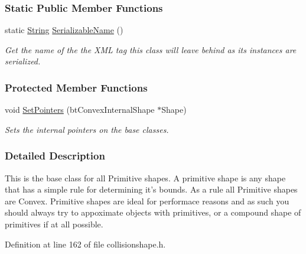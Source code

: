 \subsubsection*{Static Public Member Functions}
\begin{DoxyCompactItemize}
\item 
static \hyperlink{namespaceMezzanine_acf9fcc130e6ebf08e3d8491aebcf1c86}{String} \hyperlink{classMezzanine_1_1PrimitiveCollisionShape_a19bb44a705ff86606834feb2783500e5}{SerializableName} ()
\begin{DoxyCompactList}\small\item\em Get the name of the the XML tag this class will leave behind as its instances are serialized. \item\end{DoxyCompactList}\end{DoxyCompactItemize}
\subsubsection*{Protected Member Functions}
\begin{DoxyCompactItemize}
\item 
\hypertarget{classMezzanine_1_1PrimitiveCollisionShape_a86988cdc020efa02d292a76b9b256f7b}{
void \hyperlink{classMezzanine_1_1PrimitiveCollisionShape_a86988cdc020efa02d292a76b9b256f7b}{SetPointers} (btConvexInternalShape $\ast$Shape)}
\label{classMezzanine_1_1PrimitiveCollisionShape_a86988cdc020efa02d292a76b9b256f7b}

\begin{DoxyCompactList}\small\item\em Sets the internal pointers on the base classes. \item\end{DoxyCompactList}\end{DoxyCompactItemize}


\subsubsection{Detailed Description}
This is the base class for all Primitive shapes. A primitive shape is any shape that has a simple rule for determining it's bounds. As a rule all Primitive shapes are Convex. Primitive shapes are ideal for performace reasons and as such you should always try to appoximate objects with primitives, or a compound shape of primitives if at all possible. 

Definition at line 162 of file collisionshape.h.



